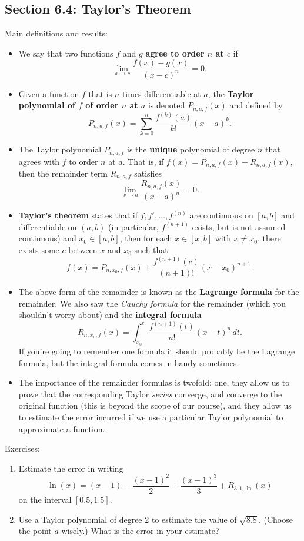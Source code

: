 \documentclass[letterpaper,12pt]{article}
\begin{document}
\subsection*{Section 6.4: Taylor's Theorem}
Main definitions and results:
\begin{itemize}
 \item We say that two functions $f$ and $g$ {\bf agree to order $n$ at $c$} if
\[
 \lim_{x\to c}\frac{f(x)-g(x)}{(x-c)^n} = 0.
\]
 \item Given a function $f$ that is $n$ times differentiable at $a$, the {\bf Taylor polynomial of $f$ of order $n$ at $a$} is denoted $P_{n,a,f}(x)$ and defined by
\[
 P_{n,a,f}(x) = \sum_{k=0}^n \frac{f^{(k)}(a)}{k!}(x-a)^k.
\]
 \item The Taylor polynomial $P_{n,a,f}$ is the {\bf unique} polynomial of degree $n$ that agrees with $f$ to order $n$ at $a$. That is, if $f(x) = P_{n,a,f}(x)+R_{n,a,f}(x)$, then the remainder term $R_{n,a,f}$ satisfies
\[
 \lim_{x\to a}\frac{R_{n,a,f}(x)}{(x-a)^n} = 0.
\]

 \item {\bf Taylor's theorem} states that if $f, f', \ldots, f^{(n)}$ are continuous on $[a,b]$ and differentiable on $(a,b)$ (in particular, $f^{(n+1)}$ exists, but is not assumed continuous) and $x_0\in [a,b]$, then for each $x\in [x,b]$ with $x\neq x_0$, there exists some $c$ between $x$ and $x_0$ such that
\[
 f(x) = P_{n,x_0,f}(x)+\frac{f^{(n+1)}(c)}{(n+1)!}(x-x_0)^{n+1}.
\]
 \item The above form of the remainder is known as the {\bf Lagrange formula} for the remainder. We also saw the {\em Cauchy formula} for the remainder (which you shouldn't worry about) and the {\bf integral formula}
\[
 R_{n,x_0,f}(x) = \int_{x_0}^x \frac{f^{(n+1)}(t)}{n!}(x-t)^n\,dt.
\]
If you're going to remember one formula it should probably be the Lagrange formula, but the integral formula comes in handy sometimes.
 \item The importance of the remainder formulas is twofold: one, they allow us to prove that the corresponding Taylor {\em series} converge, and converge to the original function (this is beyond the scope of our course), and they allow us to estimate the error incurred if we use a particular Taylor polynomial to approximate a function.
\end{itemize}



\noindent Exercises:
\begin{enumerate}
 \item Estimate the error in writing
\[
 \ln(x) = (x-1) - \frac{(x-1)^2}{2} + \frac{(x-1)^3}{3}+R_{3,1,\ln}(x)
\]
on the interval $[0.5,1.5]$.
 \item Use a Taylor polynomial of degree 2 to estimate the value of $\sqrt{8.8}$. (Choose the point $a$ wisely.) What is the error in your estimate?
\end{enumerate}
\end{document}
